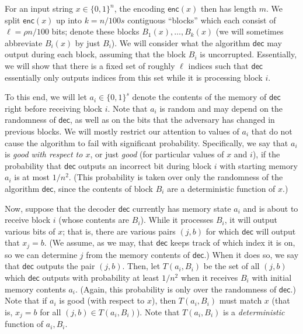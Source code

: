 \documentclass[10pt,a4paper]{article}
\begin{document}
For an input string $x\in\{0,1\}^{n}$, the encoding $\mathsf{enc}(x)$ then has length $m$. We split $\mathsf{enc}(x)$ up into $k=n/100s$ contiguous “blocks” which each consist of $\ell=\rho n/100$ bits; denote these blocks $B_{1}(x),\dots,B_{k}(x)$ (we will sometimes abbreviate $B_{i}(x)$ by just $B_{i}$). We will consider what the algorithm $\mathsf{dec}$ may output during each block, assuming that the block $B_{i}$ is uncorrupted. Essentially, we will show that there is a fixed set of roughly $\ell$ indices such that $\mathsf{dec}$ essentially only outputs indices from this set while it is processing block $i$.\par




To this end, we will let $a_{i}\in\{0,1\}^{s}$ denote the contents of the memory of $\mathsf{dec}$ right before receiving block $i$. Note that $a_{i}$ is random and may depend on the randomness of $\mathsf{dec}$, as well as on the bits that the adversary has changed in previous blocks. We will mostly restrict our attention to values of $a_{i}$ that do not cause the algorithm to fail with significant probability. Specifically, we say that $a_{i}$ is \emph{good with respect to $x$}, or just \emph{good} (for particular values of $x$ and $i$), if the probability that $\mathsf{dec}$ outputs an incorrect bit during block $i$ with starting memory $a_{i}$ is at most $1/n^{2}$. (This probability is taken over only the randomness of the algorithm $\mathsf{dec}$, since the contents of block $B_{i}$ are a deterministic function of $x$.)\par




Now, suppose that the decoder $\mathsf{dec}$ currently has memory state $a_{i}$ and is about to receive block $i$ (whose contents are $B_{i}$). While it processes $B_{i}$, it will output various bits of $x$; that is, there are various pairs $(j,b)$ for which $\mathsf{dec}$ will output that $x_{j}=b$. (We assume, as we may, that $\mathsf{dec}$ keeps track of which index it is on, so we can determine $j$ from the memory contents of $\mathsf{dec}$.) When it does so, we say that $\mathsf{dec}$ outputs the pair $(j,b)$. Then, let $T(a_{i},B_{i})$ be the set of all $(j,b)$ which $\mathsf{dec}$ outputs with probability at least $1/n^{2}$ when it receives $B_{i}$ with initial memory contents $a_{i}$. (Again, this probability is only over the randomness of $\mathsf{dec}$.) Note that if $a_{i}$ is good (with respect to $x$), then $T(a_{i},B_{i})$ must match $x$ (that is, $x_{j}=b$ for all $(j,b)\in T(a_{i},B_{i})$). Note that $T(a_{i},B_{i})$ is a \emph{deterministic} function of $a_{i},B_{i}$.\par
\end{document}
